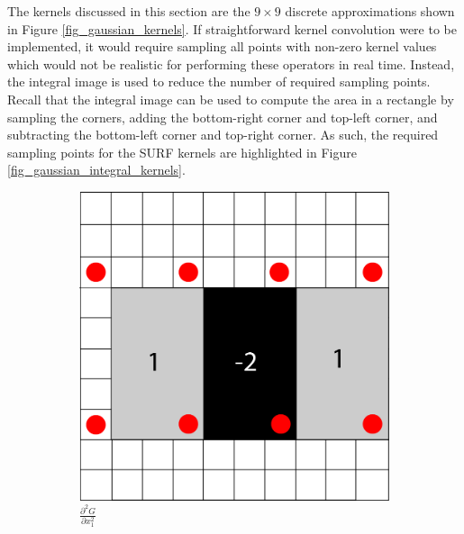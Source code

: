 \documentclass{article}
\begin{document}
The kernels discussed in this section are the $9 \times 9$ discrete approximations shown in Figure \ref{fig_gaussian_kernels}. If straightforward kernel convolution were to be implemented, it would require sampling all points with non-zero kernel values which would not be realistic for performing these operators in real time. Instead, the integral image is used to reduce the number of required sampling points. Recall that the integral image can be used to compute the area in a rectangle by sampling the corners, adding the bottom-right corner and top-left corner, and subtracting the bottom-left corner and top-right corner. As such, the required sampling points for the SURF kernels are highlighted in Figure \ref{fig_gaussian_integral_kernels}.

\begin{figure}[h]
	\centering
	\begin{subfigure}[b]{0.3\textwidth}
		\centering
		\includegraphics[width=\textwidth]{figures/hessian/gaussian_second_order_kernel_xx_integral}
		\caption{$\frac{\partial^2 G}{\partial x_1^2}$}
	\end{subfigure}
	\begin{subfigure}[b]{0.3\textwidth}
		\centering

\end{subfigure}
\end{figure}
\end{document}
